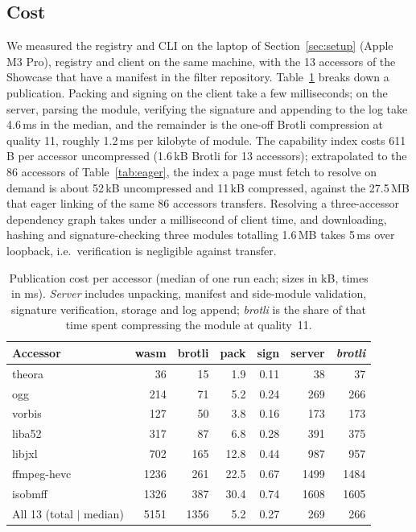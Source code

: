 \subsection{Cost}
\label{sec:registry-eval}

We measured the registry and CLI on the laptop of Section~\ref{sec:setup}
(Apple M3 Pro), registry and client on the same machine, with the 13
accessors of the Showcase that have a manifest in the filter repository.
Table~\ref{tab:reg-publish} breaks down a publication. Packing and signing on
the client take a few milliseconds; on the server, parsing the module,
verifying the signature and appending to the log take 4.6\,ms in the median,
and the remainder is the one-off Brotli compression at quality 11, roughly
1.2\,ms per kilobyte of module. The capability index costs 611\,B per
accessor uncompressed (1.6\,kB Brotli for 13 accessors); extrapolated to the
86 accessors of Table~\ref{tab:eager}, the index a page must fetch to resolve
on demand is about 52\,kB uncompressed and 11\,kB compressed, against the
27.5\,MB that eager linking of the same 86 accessors transfers. Resolving a
three-accessor dependency graph takes under a millisecond of client time, and
downloading, hashing and signature-checking three modules totalling 1.6\,MB
takes 5\,ms over loopback, i.e.\ verification is negligible against transfer.

\begin{table}[t]
\caption{Publication cost per accessor (median of one run each; sizes in kB,
times in ms). \emph{Server} includes unpacking, manifest and side-module
validation, signature verification, storage and log append; \emph{brotli} is
the share of that time spent compressing the module at quality~11.}
\label{tab:reg-publish}
\centering\footnotesize
\setlength{\tabcolsep}{4pt}
\begin{tabular}{lrrrrrr}
\toprule
Accessor & wasm & brotli & pack & sign & server & \emph{brotli} \\
\midrule
theora        &   36 &  15 &  1.9 & 0.11 &   38 &   37 \\
ogg           &  214 &  71 &  5.2 & 0.24 &  269 &  266 \\
vorbis        &  127 &  50 &  3.8 & 0.16 &  173 &  173 \\
liba52        &  317 &  87 &  6.8 & 0.28 &  391 &  375 \\
libjxl        &  702 & 165 & 12.8 & 0.44 &  987 &  957 \\
ffmpeg-hevc   & 1236 & 261 & 22.5 & 0.67 & 1499 & 1484 \\
isobmff       & 1326 & 387 & 30.4 & 0.74 & 1608 & 1605 \\
\midrule
All 13 (total $|$ median) & 5151 & 1356 & 5.2 & 0.27 & 269 & 266 \\
\bottomrule
\end{tabular}
\end{table}

